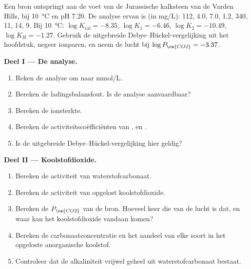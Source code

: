 \begin{problem}
\label{pb:b3:water-rock-interaction:1}
Een bron ontspringt aan de voet van de Jurassische kalksteen van de Varden Hills, bij
\qty{10}{\celsius} en pH 7.20. De analyse ervan is (in \unit{mg/L}): 
112,  4.0,  7.0,  1.2,  340,  11,
 14,  9. Bij \qty{10}{\celsius}: $\log K_{\mathrm{cal}} =
-8.35$, $\log K_1 = -6.46$, $\log K_2 = -10.49$, $\log K_H = -1.27$. Gebruik de
uitgebreide Debye--Hückel-vergelijking uit het hoofdstuk, negeer ionparen, en neem
de lucht bij $\log P_{\ce{CO2}} = -3.37$.

\medskip\noindent\textbf{Deel I --- De analyse.}
\begin{enumerate}
\item Reken de analyse om naar \unit{mmol/L}.
\item Bereken de ladingsbalansfout. Is de analyse aanvaardbaar?
\item Bereken de ionsterkte.
\item Bereken de activiteitscoëfficiënten van ,  en
  .
\item Is de uitgebreide Debye--Hückel-vergelijking hier geldig?
\end{enumerate}

\medskip\noindent\textbf{Deel II --- Koolstofdioxide.}
\begin{enumerate}[resume]
\item Bereken de activiteit van waterstofcarbonaat.
\item Bereken de activiteit van opgelost koolstofdioxide.
\item Bereken de $P_{\ce{CO2}}$ van de bron. Hoeveel keer die van de
  lucht is dat, en waar kan het koolstofdioxide vandaan komen?
\item Bereken de carbonaatconcentratie en het aandeel van elke soort in
  het opgeloste anorganische koolstof.
\item Controleer dat de alkaliniteit vrijwel geheel uit waterstofcarbonaat bestaat.
\end{enumerate}


\end{problem}
